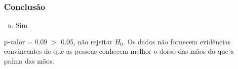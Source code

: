 
\begin{frame}
\frametitle{Conclusão}
\justifying
{}

\begin{enumerate}[(a)]
\item Sim
\end{enumerate}
\justifying
p-valor = 0.09 $>$ 0.05, não rejeitar $H_0$. Os dados não fornecem evidências convincentes de que as pessoas conhecem melhor o dorso das mãos do que a palma das mãos.

\end{frame}

